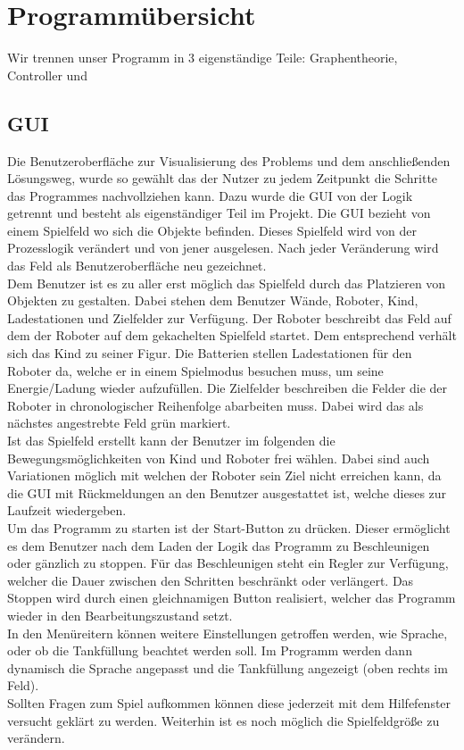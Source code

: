 \section{Programmübersicht}
Wir trennen unser Programm in 3 eigenständige Teile:
Graphentheorie, Controller und 
\subsection{GUI}

Die Benutzeroberfläche zur Visualisierung des Problems und dem anschließenden Lösungsweg, wurde so gewählt das der Nutzer zu jedem Zeitpunkt die Schritte das Programmes nachvollziehen kann. Dazu wurde die GUI von der Logik getrennt und besteht als eigenständiger Teil im Projekt. Die GUI bezieht von einem Spielfeld wo sich die Objekte befinden. Dieses Spielfeld wird von der Prozesslogik verändert und von jener ausgelesen. Nach jeder Veränderung wird das Feld als Benutzeroberfläche neu gezeichnet. \\
Dem Benutzer ist es zu aller erst möglich das Spielfeld durch das Platzieren von Objekten zu gestalten. Dabei stehen dem Benutzer Wände, Roboter, Kind, Ladestationen und Zielfelder zur Verfügung. Der Roboter beschreibt das Feld auf dem der Roboter auf dem gekachelten Spielfeld startet. Dem entsprechend verhält sich das Kind zu seiner Figur. Die Batterien stellen Ladestationen für den Roboter da, welche er in einem Spielmodus besuchen muss, um seine Energie/Ladung wieder aufzufüllen. Die Zielfelder beschreiben die Felder die der Roboter in chronologischer Reihenfolge abarbeiten muss. Dabei wird das als nächstes angestrebte Feld grün markiert. \\
Ist das Spielfeld erstellt kann der Benutzer im folgenden die Bewegungsmöglichkeiten von Kind und Roboter frei wählen. Dabei sind auch Variationen möglich mit welchen der Roboter sein Ziel nicht erreichen kann, da die GUI mit Rückmeldungen an den Benutzer ausgestattet ist, welche dieses zur Laufzeit wiedergeben. \\
Um das Programm zu starten ist der Start-Button zu drücken. Dieser ermöglicht es dem Benutzer nach dem Laden der Logik das Programm zu Beschleunigen oder gänzlich zu stoppen. Für das Beschleunigen steht ein Regler zur Verfügung, welcher die Dauer zwischen den Schritten beschränkt oder verlängert. Das Stoppen wird durch einen gleichnamigen Button realisiert, welcher das Programm wieder in den Bearbeitungszustand setzt. \\
In den Menüreitern können weitere Einstellungen getroffen werden, wie Sprache, oder ob die Tankfüllung beachtet werden soll. Im Programm werden dann dynamisch die Sprache angepasst und die Tankfüllung angezeigt (oben rechts im Feld). \\
Sollten Fragen zum Spiel aufkommen können diese jederzeit mit dem Hilfefenster versucht geklärt zu werden. Weiterhin ist es noch möglich die Spielfeldgröße zu verändern. \\
